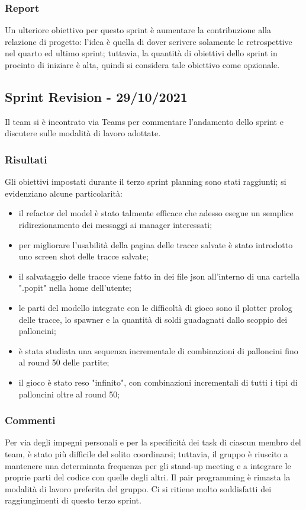 \subsubsection{Report}
Un ulteriore obiettivo per questo sprint è aumentare la contribuzione alla relazione di progetto: l'idea è quella di
dover scrivere solamente le retrospettive nel quarto ed ultimo sprint; tuttavia, la quantità di obiettivi dello sprint
in procinto di iniziare è alta, quindi si considera tale obiettivo come opzionale.

\subsection{Sprint Revision - 29/10/2021}
Il team si è incontrato via Teams per commentare l'andamento dello sprint e discutere sulle modalità di lavoro adottate.

\subsubsection{Risultati}
Gli obiettivi impostati durante il terzo sprint planning sono stati raggiunti; si evidenziano alcune particolarità:
\begin{itemize}
    \item il refactor del model è stato talmente efficace che adesso esegue un semplice ridirezionamento dei messaggi ai manager interessati;
    \item per migliorare l'usabilità della pagina delle tracce salvate è stato introdotto uno screen shot delle tracce salvate;
    \item il salvataggio delle tracce viene fatto in dei file json all'interno di una cartella ".popit" nella home dell'utente;
    \item le parti del modello integrate con le difficoltà di gioco sono il plotter prolog delle tracce, lo spawner e la quantità di soldi guadagnati dallo scoppio dei palloncini;
    \item è stata studiata una sequenza incrementale di combinazioni di palloncini fino al round 50 delle partite;
    \item il gioco è stato reso "infinito", con combinazioni incrementali di tutti i tipi di palloncini oltre al round 50;
\end{itemize}

\subsubsection{Commenti}
Per via degli impegni personali e per la specificità dei task di ciascun membro del team, è stato più difficile del
solito coordinarsi; tuttavia, il gruppo è riuscito a mantenere una determinata frequenza per gli stand-up meeting e a
integrare le proprie parti del codice con quelle degli altri. Il pair programming è rimasta la modalità di lavoro
preferita del gruppo. Ci si ritiene molto soddisfatti dei raggiungimenti di questo terzo sprint.

\newpage